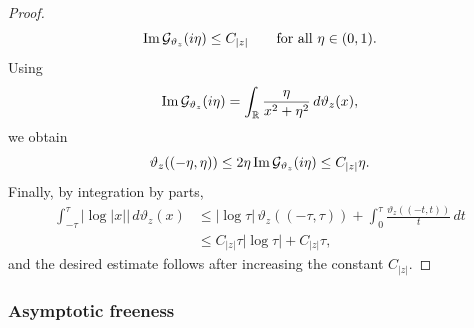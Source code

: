 \documentclass[11pt,oneside]{amsart}
\theoremstyle{plain}
\numberwithin{equation}{section}
\newcommand{\thetalimit}{\vartheta_z}
\begin{document}
\begin{proof}
\begin{equation}
\label{eq:limit-Stieltjes-bound}
        {\rm Im}\,\mathcal G_{\thetalimit}(i\eta)
        \le C_{|z|}
        \qquad \text{for all } \eta\in(0,1).
\end{equation}
Using
\[
        {\rm Im}\,\mathcal G_{\thetalimit}(i\eta)
        =
        \int_{\mathbb R}\frac{\eta}{x^2+\eta^2}\,d\thetalimit(x),
\]
we obtain
\[
        \thetalimit((-\eta,\eta))
        \le
        2\eta\,{\rm Im}\,\mathcal G_{\thetalimit}(i\eta)
        \le
        C_{|z|}\eta .
\]
Finally, by integration by parts,
\[
\begin{split}
    \int_{-\tau}^{\tau} |\log |x||\,d\thetalimit(x)
    &\le
    |\log\tau|\,\thetalimit((-\tau,\tau))
    +
    \int_0^\tau \frac{\thetalimit((-t,t))}{t}\,dt  \\
    &\le
    C_{|z|}\tau|\log\tau|
    +
    C_{|z|}\tau ,
\end{split}
\]
 and the desired estimate follows after increasing the constant $C_{|z|}$.
\end{proof}

\subsubsection{Asymptotic freeness}
\end{document}
